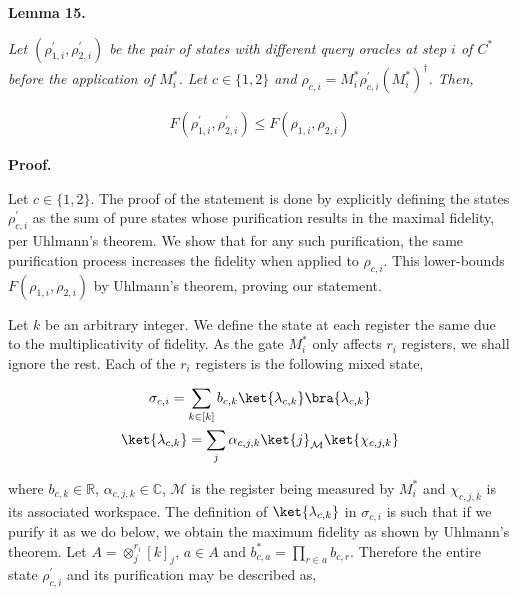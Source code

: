 \documentclass[10pt,a4paper]{article}
\begin{document}


\par\medskip\noindent\textbf{
\textbf{Lemma 15}\textbf{.}
}\par



\emph{Let $(\rho^{\prime}_{1,i},\rho^{\prime}_{2,i})$ be the pair of states with different query oracles at step $i$ of $C^{*}$ before the application of $M^{*}_{i}$. Let $c\in\{1,2\}$ and $\rho_{c,i}=M^{*}_{i}\rho^{\prime}_{c,i}(M^{*}_{i})^{\dagger}$. Then,}\par


\[\begin{gathered}
\displaystyle F(\rho^{\prime}_{1,i},\rho^{\prime}_{2,i})\leq F(\rho_{1,i},\rho_{2,i})
\end{gathered}\]







\par\medskip\noindent\textbf{Proof.}\par




Let $c\in\{1,2\}$. The proof of the statement is done by explicitly defining the states $\rho^{\prime}_{c,i}$ as the sum of pure states whose purification results in the maximal fidelity, per Uhlmann’s theorem. We show that for any such purification, the same purification process increases the fidelity when applied to $\rho_{c,i}$. This lower-bounds $F(\rho_{1,i},\rho_{2,i})$ by Uhlmann’s theorem, proving our statement.\par




Let $k$ be an arbitrary integer. We define the state at each register the same due to the multiplicativity of fidelity.
As the gate $M^{*}_{i}$ only affects $r_{i}$ registers, we shall ignore the rest. Each of the $r_{i}$ registers is the following mixed state,\par


\[\begin{gathered}
\displaystyle\sigma_{c,i} \displaystyle=\sum_{k\in[k]}b_{c,k}\ket{\lambda_{c,k}}\bra{\lambda_{c,k}} \\
\displaystyle\ket{\lambda_{c,k}} \displaystyle=\sum_{j}\alpha_{c,j,k}\ket{j}_{\mathcal{M}}\ket{\chi_{c,j,k}}
\end{gathered}\]


where $b_{c,k}\in\mathbb{R}$, $\alpha_{c,j,k}\in\mathbb{C}$, $\mathcal{M}$ is the register being measured by $M_{i}^{*}$ and $\chi_{c,j,k}$ is its associated workspace.
The definition of $\ket{\lambda_{c,k}}$ in $\sigma_{c,i}$ is such that if we purify it as we do below, we obtain the maximum fidelity as shown by Uhlmann’s theorem.
Let $A=\otimes_{j}^{r_{i}}[k]_{j}$, $a\in A$ and $b^{*}_{c,a}=\prod_{r\in a}b_{c,r}$.
Therefore the entire state $\rho^{\prime}_{c,i}$ and its purification may be described as,\par
\end{document}

